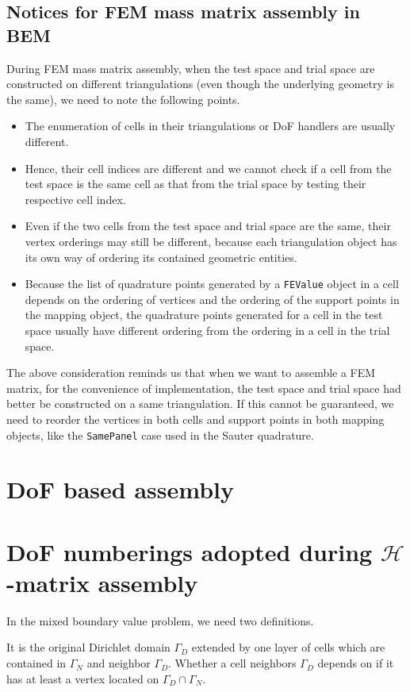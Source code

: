 \documentclass[11pt, a4paper]{book}
\begin{document}
\subsection{Notices for FEM mass matrix assembly in BEM}
\label{sec:fem-mass-matrix-assembly-in-bem}
During FEM mass matrix assembly, when the test space and trial space are constructed on different triangulations (even though the underlying geometry is the same), we need to note the following points.
\begin{itemize}
\item The enumeration of cells in their triangulations or DoF handlers are usually different.
\item Hence, their cell indices are different and we cannot check if a cell from the test space is the same cell as that from the trial space by testing their respective cell index.
\item Even if the two cells from the test space and trial space are the same, their vertex orderings may still be different, because each triangulation object has its own way of ordering its contained geometric entities.
\item Because the list of quadrature points generated by a \texttt{FEValue} object in a cell depends on the ordering of vertices and the ordering of the support points in the mapping object, the quadrature points generated for a cell in the test space usually have different ordering from the ordering in a cell in the trial space.
\end{itemize}
The above consideration reminds us that when we want to assemble a FEM matrix, for the convenience of implementation, the test space and trial space had better be constructed on a same triangulation. If this cannot be guaranteed, we need to reorder the vertices in both cells and support points in both mapping objects, like the \texttt{SamePanel} case used in the Sauter quadrature.

\section{DoF based assembly}

\section{DoF numberings adopted during $\mathcal{H}$-matrix assembly}

In the mixed boundary value problem, we need two definitions.

\begin{Definition}
  It is the original Dirichlet domain $\Gamma_D$ extended by one layer of cells which
  are contained in $\Gamma_N$ and neighbor $\Gamma_D$. Whether a cell neighbors $\Gamma_D$
  depends on if it has at least a vertex located on $\Gamma_D \cap \Gamma_N$.
\end{Definition}
\end{document}
